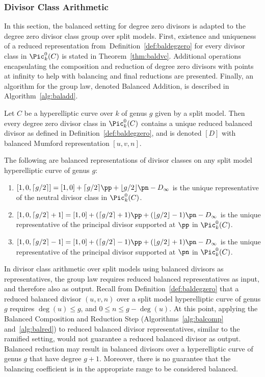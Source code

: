 \subsubsection{Divisor Class Arithmetic}\label{sec:splitdcg}
In this section, the balanced setting for degree zero divisors is adapted to the
degree zero divisor class group over split models. First, existence and
uniqueness of a reduced representation from~Definition~\ref{def:baldegzero} for
every divisor class in $\Pic^0_k(C)$ is stated in Theorem~\ref{thm:baldvc}.
Additional operations encapsulating the composition and reduction of degree zero
divisors with points at infinity to help with balancing and final reductions are
presented. Finally, an algorithm for the group law, denoted Balanced Addition,
is described in Algorithm~\ref{alg:baladd}.

\bt\label{thm:baldvc} \cite[Adapted from Theorems~10.4.16 and
~10.4.19]{Galbraith_PKC_2012} Let $C$ be a hyperelliptic curve over $k$ of genus
$g$ given by a split model. Then every degree zero divisor
class in $\Pic^0_k(C)$ contains a unique reduced balanced divisor as defined in
Definition~\ref{def:baldegzero}, and is denoted $[D]$ with balanced Mumford
representation $[u,v,n]$.
\et

\be
The following are balanced representations of divisor classes on any split model
hyperelliptic curve of genus $g$: \begin{enumerate}
  \item $[1,0,\lceil g/2 \rceil] = [1,0] + \lceil g/2 \rceil \pp + \lfloor g/2
  \rfloor \pn - D_{\infty}$ is the unique representative of the neutral divisor
  class in $\Pic^0_k(C)$.
  \item $[1,0,\lceil g/2 \rceil + 1] = [1,0] + (\lceil g/2 \rceil +1) \pp +
  (\lfloor g/2 \rfloor - 1)\pn - D_{\infty}$ is the unique representative of the
  principal divisor supported at $\pp$ in $\Pic^0_k(C)$.
  \item $[1,0,\lceil g/2 \rceil - 1] = [1,0] + (\lceil g/2 \rceil -1) \pp +
  (\lfloor g/2 \rfloor + 1)\pn - D_{\infty}$ is the unique representative of the
  principal divisor supported at $\pn$ in $\Pic^0_k(C)$.
\end{enumerate}
\ee

In divisor class arithmetic over split models using balanced divisors
as representatives, the group law requires reduced balanced representatives as
input, and therefore also as output. Recall from Definition~\ref{def:baldegzero}
that a reduced balanced divisor $(u,v,n)$ over a split model hyperelliptic curve
of genus $g$ requires $\deg(u) \leq g$, and $0 \leq n \leq g-\deg(u)$. At this
point, applying the Balanced Composition and Reduction Step
(Algorithms~\ref{alg:balcomp} and~\ref{alg:balred}) to reduced balanced divisor
representatives, similar to the ramified setting, would not guarantee a reduced
balanced divisor as output. Balanced reduction may result in balanced divisors
over a hyperelliptic curve of genus $g$ that have degree $g + 1$. Moreover,
there is no guarantee that the balancing coefficient is in the appropriate range
to be considered balanced.

